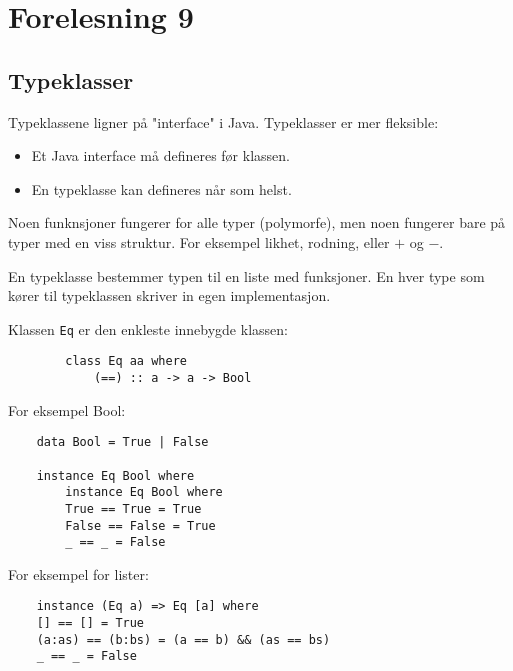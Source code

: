 \documentclass{article}
\begin{document}
    \section{Forelesning 9}

    \subsection{Typeklasser}
    Typeklassene ligner på "interface" i Java. Typeklasser er mer fleksible:

    \begin{itemize}
        \item Et Java interface må defineres før klassen.
        \item En typeklasse kan defineres når som helst.
    \end{itemize}

    \begin{idea}
        Noen funknsjoner fungerer for alle typer (polymorfe), men noen fungerer bare på typer med en viss struktur. For eksempel likhet, rodning, eller \( + \) og \( - \).
    \end{idea}

    En typeklasse bestemmer typen til en liste med funksjoner. En hver type som kører til typeklassen skriver in egen implementasjon.

    \begin{eg}
        Klassen \texttt{Eq} er den enkleste innebygde klassen:

        \begin{lstlisting}
        class Eq aa where
            (==) :: a -> a -> Bool 
        \end{lstlisting}

    For eksempel Bool:

    \begin{lstlisting}
    data Bool = True | False

    instance Eq Bool where
        instance Eq Bool where        
        True == True = True
        False == False = True
        _ == _ = False
    \end{lstlisting}    

    For eksempel for lister:

    \begin{lstlisting}
    instance (Eq a) => Eq [a] where
    [] == [] = True
    (a:as) == (b:bs) = (a == b) && (as == bs)
    _ == _ = False
    \end{lstlisting}
    \end{eg}
\end{document}
